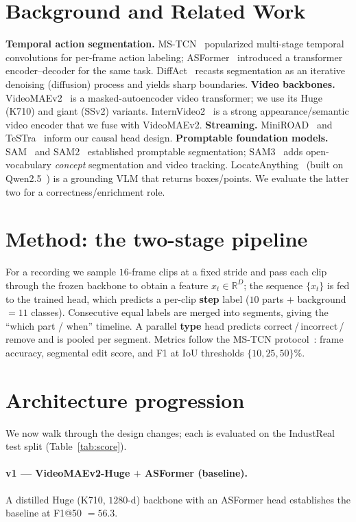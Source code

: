 \documentclass[11pt]{article}
\begin{document}
\section{Background and Related Work}
\textbf{Temporal action segmentation.} MS-TCN~\cite{mstcn} popularized multi-stage temporal convolutions for
per-frame action labeling; ASFormer~\cite{asformer} introduced a transformer encoder--decoder for the same task.
DiffAct~\cite{diffact} recasts segmentation as an iterative denoising (diffusion) process and yields sharp
boundaries. \textbf{Video backbones.} VideoMAEv2~\cite{videomae} is a masked-autoencoder video transformer;
we use its Huge (K710) and giant (SSv2) variants. InternVideo2~\cite{internvideo2} is a strong appearance/semantic
video encoder that we fuse with VideoMAEv2. \textbf{Streaming.} MiniROAD~\cite{miniroad} and TeSTra~\cite{testra}
inform our causal head design. \textbf{Promptable foundation models.} SAM~\cite{sam} and SAM2~\cite{sam2}
established promptable segmentation; SAM3~\cite{sam3} adds open-vocabulary \emph{concept} segmentation and video
tracking. LocateAnything~\cite{locateanything} (built on Qwen2.5~\cite{qwen25}) is a grounding VLM that returns
boxes/points. We evaluate the latter two for a correctness/enrichment role.

\section{Method: the two-stage pipeline}
For a recording we sample $16$-frame clips at a fixed stride and pass each clip through the frozen backbone to
obtain a feature $x_t \in \mathbb{R}^{D}$; the sequence $\{x_t\}$ is fed to the trained head, which predicts a
per-clip \textbf{step} label ($10$ parts $+$ background $=11$ classes). Consecutive equal labels are merged into
segments, giving the ``which part / when'' timeline. A parallel \textbf{type} head predicts
correct\,/\,incorrect\,/\,remove and is pooled per segment. Metrics follow the MS-TCN protocol~\cite{mstcn}:
frame accuracy, segmental edit score, and F1 at IoU thresholds $\{10,25,50\}\%$.

\section{Architecture progression}
\label{sec:prog}
We now walk through the design changes; each is evaluated on the IndustReal test split (Table~\ref{tab:score}).

\paragraph{v1 --- VideoMAEv2-Huge $+$ ASFormer (baseline).}
A distilled Huge (K710, $1280$-d) backbone with an ASFormer head establishes the baseline at F1@50 $=56.3$.
\end{document}
